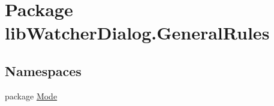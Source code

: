 \hypertarget{namespacelib_watcher_dialog_1_1_general_rules}{\section{Package lib\+Watcher\+Dialog.\+General\+Rules}
\label{namespacelib_watcher_dialog_1_1_general_rules}
}
\subsection*{Namespaces}
\begin{DoxyCompactItemize}
\item 
package \hyperlink{namespacelib_watcher_dialog_1_1_general_rules_1_1_mode}{Mode}
\end{DoxyCompactItemize}
